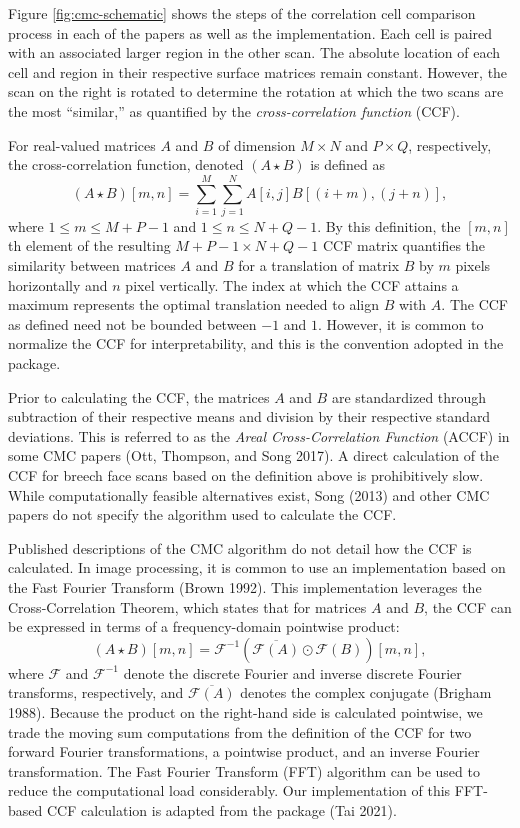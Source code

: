 Figure \ref{fig:cmc-schematic} shows the steps of the correlation cell comparison process in each of the papers as well as the  implementation.
Each cell is paired with an associated larger region in the other scan.
The absolute location of each cell and region in their respective surface matrices remain constant.
However, the scan on the right is rotated to determine the rotation at which the two scans are the most ``similar,'' as quantified by the \emph{cross-correlation function} (CCF).

For real-valued matrices \(A\) and \(B\) of dimension \(M \times N\) and \(P \times Q\), respectively, the cross-correlation function, denoted \((A \star B)\) is defined as
\[
(A \star B)[m,n] = \sum_{i=1}^M \sum_{j=1}^N A[i,j] B[(i + m), (j + n)],
\] where \(1 \leq m \leq M + P - 1\) and \(1 \leq n \leq N + Q - 1\).
By this definition, the \([m,n]\)th element of the resulting \(M + P - 1 \times N + Q - 1\) CCF matrix quantifies the similarity between matrices \(A\) and \(B\) for a translation of matrix \(B\) by \(m\) pixels horizontally and \(n\) pixel vertically.
The index at which the CCF attains a maximum represents the optimal translation needed to align \(B\) with \(A\).
The CCF as defined need not be bounded between \(-1\) and \(1\).
However, it is common to normalize the CCF for interpretability, and this is the convention adopted in the  package.

Prior to calculating the CCF, the matrices \(A\) and \(B\) are standardized through subtraction of their respective means and division by their respective standard deviations.
This is referred to as the \emph{Areal Cross-Correlation Function} (ACCF) in some CMC papers (Ott, Thompson, and Song 2017).
A direct calculation of the CCF for breech face scans based on the definition above is prohibitively slow.
While computationally feasible alternatives exist, Song (2013) and other CMC papers do not specify the algorithm used to calculate the CCF.

Published descriptions of the CMC algorithm do not detail how the CCF is calculated.
In image processing, it is common to use an implementation based on the Fast Fourier Transform (Brown 1992).
This implementation leverages the Cross-Correlation Theorem, which states that for matrices \(A\) and \(B\), the CCF can be expressed in terms of a frequency-domain pointwise product:
\[
(A \star B )[m,n]= \mathcal{F}^{-1}\left(\overline{\mathcal{F}(A)} \odot \mathcal{F}(B)\right)[m,n],
\]
where \(\mathcal{F}\) and \(\mathcal{F}^{-1}\) denote the discrete Fourier and inverse discrete Fourier transforms, respectively, and \(\overline{\mathcal{F}(A)}\) denotes the complex conjugate (Brigham 1988).
Because the product on the right-hand side is calculated pointwise, we trade the moving sum computations from the definition of the CCF for two forward Fourier transformations, a pointwise product, and an inverse Fourier transformation.
The Fast Fourier Transform (FFT) algorithm can be used to reduce the computational load considerably.
Our implementation of this FFT-based CCF calculation is adapted from the  package (Tai 2021).


